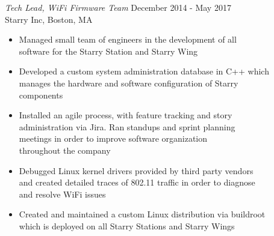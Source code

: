 \documentclass[line,margin]{res}
\begin{document}
\begin{resume}
            {\sl Tech Lead, WiFi Firmware Team} \hfill December 2014 - May 2017 \\
            Starry Inc, Boston, MA
                \begin{itemize} \itemsep -2pt %
                    \item Managed small team of engineers in the development of all \\
                          software for the Starry Station and Starry Wing %
                    \item Developed a custom system administration database in C++ which \\
                          manages the hardware and software configuration of Starry \\
                          components %
                    \item Installed an agile process, with feature tracking and story \\
                          administration via Jira. Ran standups and sprint planning \\
                          meetings in order to improve software organization \\
                          throughout the company %
                    \item Debugged Linux kernel drivers provided by third party vendors \\
                          and created detailed traces of 802.11 traffic in order to diagnose \\
                          and resolve WiFi issues
                    \item Created and maintained a custom Linux distribution via buildroot \\
                          which is deployed on all Starry Stations and Starry Wings
                \end{itemize}


\end{resume}
\end{document}
